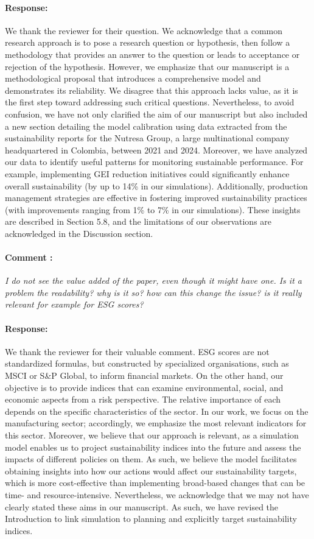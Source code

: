 \documentclass[11pt]{article}
\newcommand{\ReviewerComment}[1]{\paragraph*{Comment \stepcounter{NumComment}\arabic{NumComment}:} \textit{#1}}
\newcommand{\AuthorResponse}{\paragraph*{Response:}}
\begin{document}
    \AuthorResponse{We thank the reviewer for their question. We acknowledge that a common research approach is to pose a research question or hypothesis, then follow a methodology that provides an answer to the question or leads to acceptance or rejection of the hypothesis. However, we emphasize that our manuscript is a methodological proposal that introduces a comprehensive model and demonstrates its reliability. We disagree that this approach lacks value, as it is the first step toward addressing such critical questions. Nevertheless, to avoid confusion, we have not only clarified the aim of our manuscript but also included a new section detailing the model calibration using data extracted from the sustainability reports for the Nutresa Group, a large multinational company headquartered in Colombia, between 2021 and 2024. Moreover, we have analyzed our data to identify useful patterns for monitoring sustainable performance. For example, implementing GEI reduction initiatives could significantly enhance overall sustainability (by up to 14\% in our simulations). Additionally, production management strategies are effective in fostering improved sustainability practices (with improvements ranging from 1\% to 7\% in our simulations). These insights are described in Section 5.8, and the limitations of our observations are acknowledged in the Discussion section.}
    
    \ReviewerComment{I do not see the value added of the paper, even though it might have one. Is it a problem the readability? why is it so? how can this change the issue? is it really relevant for example for ESG scores?}
    
    \AuthorResponse{We thank the reviewer for their valuable comment. ESG scores are not standardized formulas, but constructed by specialized organisations, such as MSCI or S\&P Global, to inform financial markets. On the other hand, our objective is to provide indices that can examine environmental, social, and economic aspects from a risk perspective. The relative importance of each depends on the specific characteristics of the sector. In our work, we focus on the manufacturing sector; accordingly, we emphasize the most relevant indicators for this sector. Moreover, we believe that our approach is relevant, as a simulation model enables us to project sustainability indices into the future and assess the impacts of different policies on them. As such, we believe the model facilitates obtaining insights into how our actions would affect our sustainability targets, which is more cost-effective than implementing broad-based changes that can be time- and resource-intensive. Nevertheless, we acknowledge that we may not have clearly stated these aims in our manuscript. As such, we have revised the Introduction to link simulation to planning and explicitly target sustainability indices.}
\end{document}

